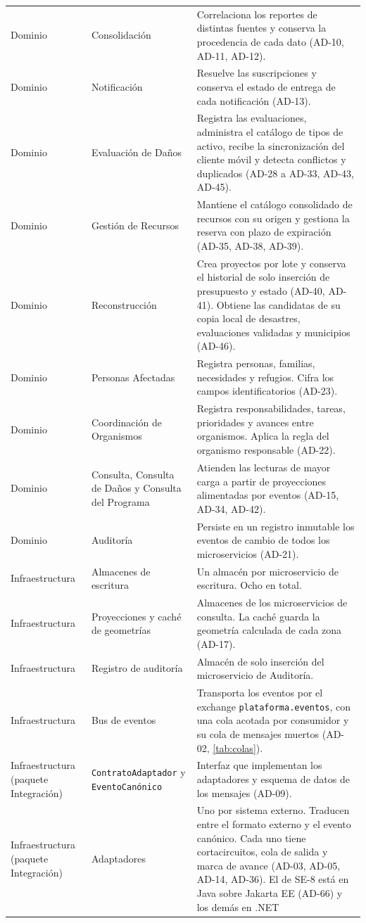 \documentclass[11pt,letterpaper]{article}
\providecommand{\br}{\discretionary{}{}{}}
\begin{document}
\begin{longtable}{L{2.6cm} L{4.0cm} L{9.2cm}}
Dominio & Consolidación & Correlaciona los reportes de distintas fuentes y conserva la procedencia
de cada dato (AD-10, AD-11, AD-12). \\
Dominio & Notificación & Resuelve las suscripciones y conserva el estado de entrega de cada
notificación (AD-13). \\
Dominio & Evaluación de Daños & Registra las evaluaciones, administra el catálogo de tipos de
activo, recibe la sincronización del cliente móvil y detecta conflictos y duplicados (AD-28 a
AD-33, AD-43, AD-45). \\
Dominio & Gestión de Recursos & Mantiene el catálogo consolidado de recursos con su origen y
gestiona la reserva con plazo de expiración (AD-35, AD-38, AD-39). \\
Dominio & Reconstrucción & Crea proyectos por lote y conserva el historial de solo inserción de
presupuesto y estado (AD-40, AD-41). Obtiene las candidatas de su copia local de desastres,
evaluaciones validadas y municipios (AD-46). \\
Dominio & Personas Afectadas & Registra personas, familias, necesidades y refugios. Cifra los campos
identificatorios (AD-23). \\
Dominio & Coordinación de Organismos & Registra responsabilidades, tareas, prioridades y avances
entre organismos. Aplica la regla del organismo responsable (AD-22). \\
Dominio & Consulta, Consulta de Daños y Consulta del Programa & Atienden las lecturas de mayor
carga a partir de proyecciones alimentadas por eventos (AD-15, AD-34, AD-42). \\
Dominio & Auditoría & Persiste en un registro inmutable los eventos de cambio de todos los
microservicios (AD-21). \\
Infraestructura & Almacenes de escritura & Un almacén por microservicio de escritura. Ocho en
total. \\
Infraestructura & Proyecciones y caché de geometrías & Almacenes de los microservicios de consulta.
La caché guarda la geometría calculada de cada zona (AD-17). \\
Infraestructura & Registro de auditoría & Almacén de solo inserción del microservicio de
Auditoría. \\
Infraestructura & Bus de eventos & Transporta los eventos por el exchange
\texttt{plataforma.\br{}eventos}, con una cola acotada por consumidor y su cola de mensajes muertos
(AD-02, \cref{tab:colas}). \\
Infraestructura (paquete Integración) & \texttt{ContratoAdaptador} y \texttt{EventoCanónico} & Interfaz que implementan
los adaptadores y esquema de datos de los mensajes (AD-09). \\
Infraestructura (paquete Integración) & Adaptadores & Uno por sistema externo. Traducen entre el
formato externo y el evento canónico. Cada uno tiene cortacircuitos, cola de salida y marca de avance
(AD-03, AD-05, AD-14, AD-36). El de SE-8 está en Java sobre Jakarta EE (AD-66) y los demás en .NET \\
\end{longtable}
\end{document}
